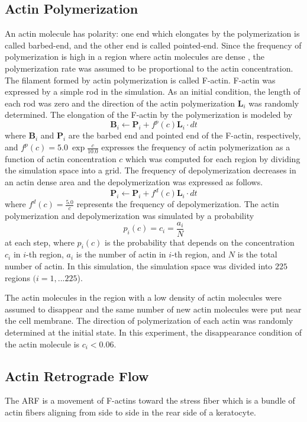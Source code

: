 \documentclass[a4paper,12pt, oneside]{book}
\begin{document}
\subsection{Actin Polymerization}
An actin molecule has polarity: one end which elongates by the polymerization is called barbed-end, and the other end is called pointed-end.
Since the frequency of polymerization is high in a region where actin molecules are dense \cite{yumura1998spatiotemporal}, the polymerization rate was assumed to be  proportional to the actin concentration.
The filament formed by actin polymerization is called F-actin.
F-actin was expressed by a simple  rod in the simulation. 
As an initial condition,  the length of each rod was zero and the direction of the actin polymerization $\bm{L}_i$ was  randomly determined.
The elongation of the F-actin by the polymerization is modeled by
\begin{equation}
\bm{B}_i \gets \bm{P}_i + f^p(c)\bm{L}_i \cdot dt
\end{equation}
where $\bm{B}_i$ and $\bm{P}_i$ are the barbed end and pointed end of the F-actin, respectively, and $f^p(c) = 5.0~\exp{\frac{c}{10.0}}$ expresses the frequency of actin polymerization as a function of actin concentration $c$ which was computed for each region by dividing the simulation space into a grid.
The frequency of depolymerization decreases in an actin dense area and the depolymerization was expressed  as follows.
\begin{equation}
\bm{P}_i \gets \bm{P}_i + f^d(c)\bm{L}_i \cdot dt
\end{equation}
where $f^d(c) = \frac{5.0}{c}$ represents the frequency of depolymerization. 
The actin polymerization and depolymerization was simulated by a probability  \[p_i(c) = c_i = \frac{a_i}{N}\] at each step, where $p_i(c)$ is the probability that depends on the concentration $c_i$ in $i$-th region, $a_i$ is the number of actin in $i$-th region, and $N$ is the total number of actin.
In this simulation, the simulation space was divided into $225$ regions $(i = 1,...225$).

The actin molecules in the region with a low density of actin molecules were assumed to disappear and the same number of new actin molecules were put near the cell membrane.
The direction of polymerization of each actin was randomly determined at the initial state. 
In this experiment, the disappearance condition of the actin molecule is $c_i<0.06$.

\subsection{Actin Retrograde Flow}
The ARF is a movement of F-actins toward the stress fiber which is a bundle of actin fibers aligning from side to side in the rear side of a keratocyte. 
\end{document}
